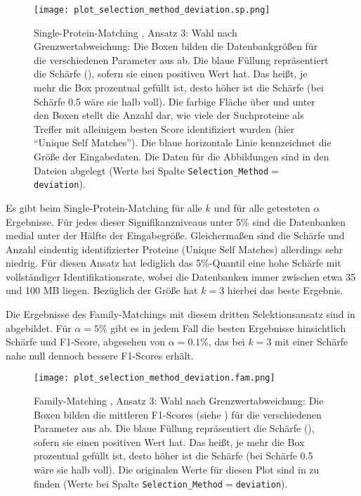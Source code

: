         \begin{figure}[H]
            \centering
            \texttt{[image: plot\_selection\_method\_deviation.sp.png]}
            \caption[Single-Protein-Matching , Ansatz 3: Wahl nach Grenzwertabweichung]{Single-Protein-Matching , Ansatz 3: Wahl nach Grenzwertabweichung: Die Boxen bilden die Datenbankgrößen für die verschiedenen Parameter aus  ab. Die blaue Füllung repräsentiert die Schärfe (), sofern sie einen positiven Wert hat. Das heißt, je mehr die Box prozentual gefüllt ist, desto höher ist die Schärfe (bei Schärfe 0.5 wäre sie halb voll). Die farbige Fläche über und unter den Boxen stellt die Anzahl dar, wie viele der Suchproteine als Treffer mit alleinigem besten Score identifiziert wurden (hier ``Unique Self Matches''). Die blaue horizontale Linie kennzeichnet die Größe der Eingabedaten. Die Daten für die Abbildungen sind in den Dateien  abgelegt (Werte bei Spalte \texttt{Selection\_Method}$=$\texttt{deviation}).}
            \label{fig:selection_method.deviation.sp}
        \end{figure}

        Es gibt beim Single-Protein-Matching für alle $k$ und für alle getesteten $\alpha$ Ergebnisse. Für jedes dieser Signifikanzniveaus unter 5\% sind die Datenbanken medial unter der Hälfte der Eingabegröße. Gleichermaßen sind die Schärfe und Anzahl eindeutig identifizierter Proteine (Unique Self Matches) allerdings sehr niedrig. Für diesen Ansatz hat lediglich das 5\%-Quantil eine hohe Schärfe mit vollständiger Identifikationsrate, wobei die Datenbanken immer zwischen etwa 35 und 100 \acs{MB} liegen. Bezüglich der Größe hat $k=3$ hierbei das beste Ergebnis.

        Die Ergebnisse des Family-Matchings mit diesem dritten Selektionsansatz sind in  abgebildet. Für $\alpha=5\%$ gibt es in jedem Fall die besten Ergebnisse hinsichtlich Schärfe und F1-Score, abgesehen von $\alpha=0.1\%$, das bei $k=3$ mit einer Schärfe nahe null dennoch bessere F1-Scores erhält. 

        \begin{figure}[H]
            \centering
            \texttt{[image: plot\_selection\_method\_deviation.fam.png]}
            \caption[Family-Matching , Ansatz 3: Wahl nach Grenzwertabweichung]{Family-Matching , Ansatz 3: Wahl nach Grenzwertabweichung: Die Boxen bilden die mittleren F1-Scores (siehe ) für die verschiedenen Parameter aus  ab. Die blaue Füllung repräsentiert die Schärfe (), sofern sie einen positiven Wert hat. Das heißt, je mehr die Box prozentual gefüllt ist, desto höher ist die Schärfe (bei Schärfe 0.5 wäre sie halb voll). Die originalen Werte für diesen Plot sind in  zu finden (Werte bei Spalte \texttt{Selection\_Method}$=$\texttt{deviation}).}
            \label{fig:selection_method.deviation.fam}
        \end{figure}

